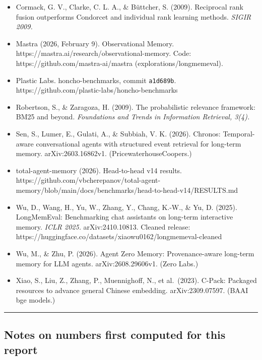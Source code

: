 \documentclass[11pt]{article}
\providecommand{\tightlist}{\setlength{\itemsep}{0pt}\setlength{\parskip}{0pt}}
\begin{document}
\begin{itemize}
\tightlist
\item
  Cormack, G. V., Clarke, C. L. A., \& Büttcher, S. (2009). Reciprocal rank fusion outperforms Condorcet and
  individual rank learning methods. \emph{SIGIR 2009.}
\item
  Mastra (2026, February 9). Observational Memory. https://mastra.ai/research/observational-memory. Code:
  https://github.com/mastra-ai/mastra (explorations/longmemeval).
\item
  Plastic Labs. honcho-benchmarks, commit \texttt{a1d689b}. https://github.com/plastic-labs/honcho-benchmarks
\item
  Robertson, S., \& Zaragoza, H. (2009). The probabilistic relevance framework: BM25 and beyond.
  \emph{Foundations and Trends in Information Retrieval, 3(4).}
\item
  Sen, S., Lumer, E., Gulati, A., \& Subbiah, V. K. (2026). Chronos: Temporal-aware conversational agents
  with structured event retrieval for long-term memory. arXiv:2603.16862v1. (PricewaterhouseCoopers.)
\item
  total-agent-memory (2026). Head-to-head v14 results.
  https://github.com/vbcherepanov/total-agent-memory/blob/main/docs/benchmarks/head-to-head-v14/RESULTS.md
\item
  Wu, D., Wang, H., Yu, W., Zhang, Y., Chang, K.-W., \& Yu, D. (2025). LongMemEval: Benchmarking chat
  assistants on long-term interactive memory. \emph{ICLR 2025.} arXiv:2410.10813. Cleaned release:
  https://huggingface.co/datasets/xiaowu0162/longmemeval-cleaned
\item
  Wu, M., \& Zhu, P. (2026). Agent Zero Memory: Provenance-aware long-term memory for LLM agents.
  arXiv:2608.29606v1. (Zero Labs.)
\item
  Xiao, S., Liu, Z., Zhang, P., Muennighoff, N., et al.~(2023). C-Pack: Packaged resources to advance general
  Chinese embedding. arXiv:2309.07597. (BAAI bge models.)
\end{itemize}

\begin{center}\rule{0.5\linewidth}{0.5pt}\end{center}

\hypertarget{notes-on-numbers-first-computed-for-this-report}{%
\subsection{Notes on numbers first computed for this report}\label{notes-on-numbers-first-computed-for-this-report}}
\end{document}
